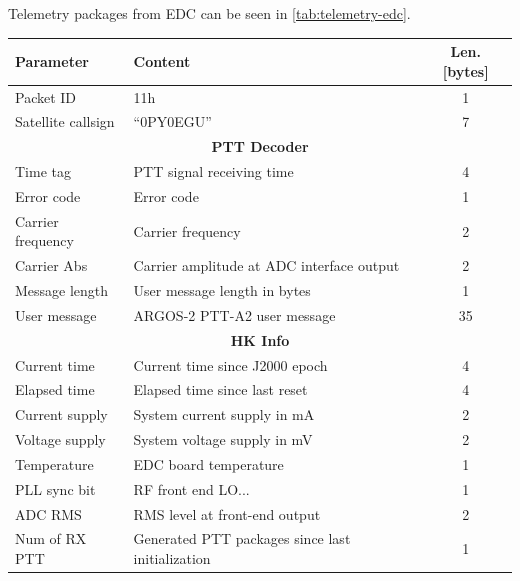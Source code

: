 Telemetry packages from EDC can be seen in \autoref{tab:telemetry-edc}.

\begin{table}[!ht]
    \centering
    \begin{tabular}{llc}
        \toprule[1.5pt]
        \textbf{Parameter} & \textbf{Content}                                 & \textbf{Len. [bytes]} \\
        \midrule
        Packet ID          & 11h                                              & 1 \\
        Satellite callsign & ``0PY0EGU''                                      & 7 \\
        \midrule
        \multicolumn{3}{c}{\textbf{PTT Decoder}} \\
        \midrule
        Time tag           & PTT signal receiving time                        & 4 \\
        Error code         & Error code                                       & 1 \\
        Carrier frequency  & Carrier frequency                                & 2 \\
        Carrier Abs        & Carrier amplitude at ADC interface output        & 2 \\
        Message length     & User message length in bytes                     & 1 \\
        User message       & ARGOS-2 PTT-A2 user message                      & 35 \\
        \midrule
        \multicolumn{3}{c}{\textbf{HK Info}} \\
        \midrule
        Current time       & Current time since J2000 epoch                   & 4 \\
        Elapsed time       & Elapsed time since last reset                    & 4 \\
        Current supply     & System current supply in mA                      & 2 \\
        Voltage supply     & System voltage supply in mV                      & 2 \\
        Temperature        & EDC board temperature                            & 1 \\
        PLL sync bit       & RF front end LO...                               & 1 \\
        ADC RMS            & RMS level at front-end output                    & 2 \\
        Num of RX PTT      & Generated PTT packages since last initialization & 1 \\

\end{tabular}
\end{table}
